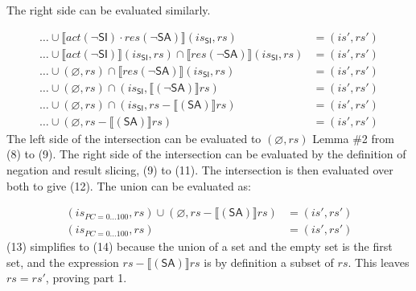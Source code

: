 \documentclass[12pt, letterpaper]{article}
\let\emptyset\varnothing
\newcommand\interp[1]{\llbracket #1 \rrbracket}
\begin{document}
     The right side can be evaluated similarly.
 \par\nobreak
 {\fontsize{10pt}{12pt}\selectfont
 \begin{align}
     \ldots \cup %
     \interp{ \mathit{act}(\neg\mathsf{SI}) \cdot
      \mathit{res}(\neg\mathsf{SA}) } (\mathit{is_{\mathsf{SI}}}, \mathit{rs})
     &=
     (\mathit{is}', \mathit{rs}')
     \\
     \ldots \cup %
     \interp{ \mathit{act}(\neg\mathsf{SI}) } (\mathit{is_{\mathsf{SI}}}, \mathit{rs}) \cap
     \interp{ \mathit{res}(\neg\mathsf{SA}) } (\mathit{is_{\mathsf{SI}}}, \mathit{rs})
     &=
     (\mathit{is}', \mathit{rs}')
     \\
     \ldots \cup 
     (\emptyset, \mathit{rs}) \cap
     \interp{ \mathit{res}(\neg\mathsf{SA}) } (\mathit{is_{\mathsf{SI}}}, \mathit{rs})
     &=
     (\mathit{is}', \mathit{rs}')
     \\ %
     \ldots \cup 
     (\emptyset, \mathit{rs}) \cap
     (\mathit{is_{\mathsf{SI}}}, \interp{ (\neg\mathsf{SA}) } \mathit{rs})
     &=
     (\mathit{is}', \mathit{rs}')
     \\
     \ldots \cup 
     (\emptyset, \mathit{rs}) \cap
     (\mathit{is_{\mathsf{SI}}}, \mathit{rs} - \interp{ (\mathsf{SA}) } \mathit{rs})
     &=
     (\mathit{is}', \mathit{rs}') %
     \\
     \ldots \cup 
     (\emptyset, \mathit{rs} - \interp{ (\mathsf{SA}) } \mathit{rs})
     &=
     (\mathit{is}', \mathit{rs}')
 \end{align}
 }%
     The left side of the intersection can be evaluated to $(\emptyset, \mathit{rs})$ Lemma \#2 from (8) to (9). The right side of the intersection can be evaluated by the definition of negation and result slicing, (9) to (11).  The intersection is then evaluated over both to give (12).  The union can be evaluated as:
 \par\nobreak
 {\fontsize{10pt}{12pt}\selectfont
 \begin{align}
     (\mathit{is_{PC=0\ldots100}}, \mathit{rs}) \cup 
     (\emptyset, \mathit{rs} - \interp{ (\mathsf{SA}) } \mathit{rs})
     &=
     (\mathit{is}', \mathit{rs}')
     \\
     (\mathit{is_{PC=0\ldots100}}, \mathit{rs})
     &=
     (\mathit{is}', \mathit{rs}')
 \end{align}
 }%
     (13) simplifies to (14) because the union of a set and the empty set is the first set, and the expression $\mathit{rs} - \interp{ (\mathsf{SA}) } \mathit{rs}$ is by definition a subset of $\mathit{rs}$.  This leaves $\mathit{rs} = \mathit{rs}'$, proving part 1. 
\end{document}
